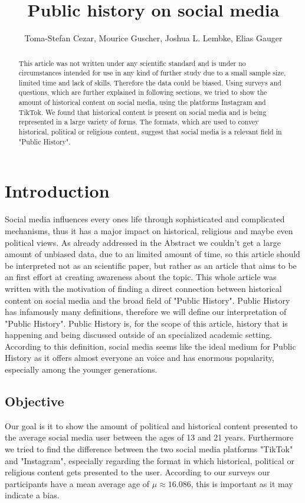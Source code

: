 \documentclass{article}
\title{Public history on social media}
\author{Toma-Stefan Cezar, Mourice Guscher, Joshua L. Lembke, Elias Gauger}
\begin{document}
\maketitle

\begin{abstract}
This article was not written under any scientific standard and is under no circumstances intended for use in any kind of further study due to a small sample size, limited time and lack of skills. Therefore the data could be biased. Using surveys and questions, which are further explained in following sections, we tried to show the amount of historical content on social media, using the platforms Instagram and TikTok. We found that historical content is present on social media and is being represented in a large variety of forms. The formats, which are used to convey historical, political or religious content, suggest that social media is a relevant field in "Public History".
\end{abstract}

\section{Introduction}

Social media influences every ones life through sophisticated and complicated mechanisms, thus it has a major impact on historical, religious and maybe even political views. As already addressed in the Abstract we couldn't get a large amount of unbiased data, due to an limited amount of time, so this article should be interpreted not as an scientific paper, but rather as an article that aims to be an first effort at creating awareness about the topic. This whole article was written with the motivation of finding a direct connection between historical content on social media and the broad field of "Public History". Public History has infamously many definitions, therefore we will define our interpretation of "Public History". Public History is, for the scope of this article, history that is happening and being discussed outside of an specialized academic setting. According to this definition, social media seems like the ideal medium for Public History as it offers almost everyone an voice and has enormous popularity, especially among the younger generations.

\subsection{Objective}
 Our goal is it to show the amount of political and historical content presented to the average social media user between the ages of 13 and 21 years. Furthermore we tried to find the difference between the two social media platforms "TikTok" and "Instagram", especially regarding the format in which historical, political or religious content gets presented to the user. According to our surveys our participants have a mean average age of $\mu \approx 16.086$, this is important as it may indicate a bias.
 
\end{document}
